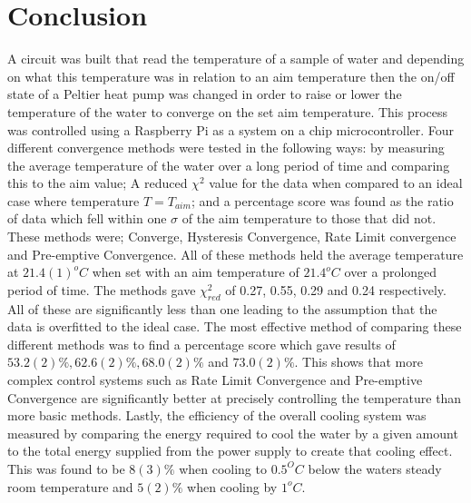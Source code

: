 \documentclass[10pt]{article}
\begin{document}
\section*{Conclusion}
A circuit was built that read the temperature of a sample of water and depending on what this temperature was in relation to an aim temperature then the on/off state of a Peltier heat pump was changed in order to raise or lower the temperature of the water to converge on the set aim temperature. This process was controlled using a Raspberry Pi as a system on a chip microcontroller. Four different convergence methods were tested in the following ways: by measuring the average temperature of the water over a long period of time and comparing this to the aim value; A reduced $\chi^2$ value for the data when compared to an ideal case where temperature $T=T_{aim}$; and a percentage score was found as the ratio of data which fell within one $\sigma$ of the aim temperature to those that did not. These methods were; Converge, Hysteresis Convergence, Rate Limit convergence and Pre-emptive Convergence. All of these methods held the average temperature at $21.4(1)^oC$ when set with an aim temperature of $21.4^oC$ over a prolonged period of time. The methods gave $\chi^2_{red}$ of 0.27, 0.55, 0.29 and 0.24 respectively. All of these are significantly less than one leading to the assumption that the data is overfitted to the ideal case. The most effective method of comparing these different methods was to find a percentage score which gave results of $53.2(2)\%, 62.6(2)\%, 68.0(2)\%$ and $73.0(2)\%$. This shows that more complex control systems such as Rate Limit Convergence and Pre-emptive Convergence are significantly better at precisely controlling the temperature than more basic methods. Lastly, the efficiency of the overall cooling system was measured by comparing the energy required to cool the water by a given amount to the total energy supplied from the power supply to create that cooling effect. This was found to be $8(3)\%$ when cooling to $0.5^OC$ below the waters steady room temperature and $5(2)\%$ when cooling by $1^oC$. 






\newpage
\appendix
\end{document}

